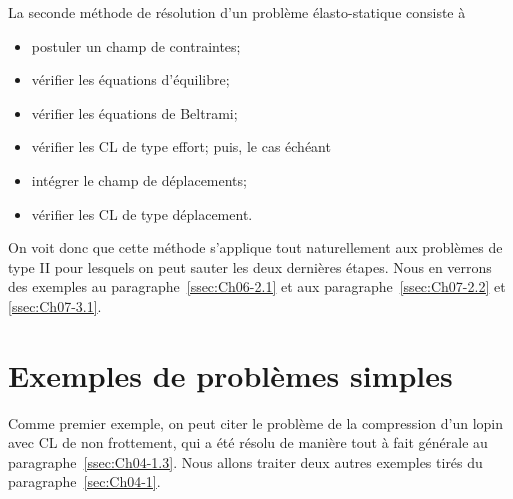 La seconde méthode de résolution d'un problème élasto-statique consiste à 
\begin{itemize}
    \item postuler un champ de contraintes;
    \item vérifier les équations d'équilibre;
    \item vérifier les équations de Beltrami;
    \item vérifier les CL de type effort;
puis, le cas échéant 
\end{itemize}
\begin{itemize}
    \item intégrer le champ de déplacements;
    \item  vérifier les CL de type déplacement.
\end{itemize}
On voit donc que cette méthode s'applique tout naturellement aux problèmes de type II pour lesquels on peut sauter les deux dernières étapes.
Nous en verrons des exemples au paragraphe~\ref{ssec:Ch06-2.1} et aux paragraphe~\ref{ssec:Ch07-2.2} et \ref{ssec:Ch07-3.1}.

\section{Exemples de problèmes simples}
Comme premier exemple, on peut citer le problème de la compression d'un lopin avec CL de non frottement, qui a été résolu de manière tout à fait générale au paragraphe~\ref{ssec:Ch04-1.3}.
Nous allons traiter deux autres exemples tirés du paragraphe~\ref{sec:Ch04-1}.

